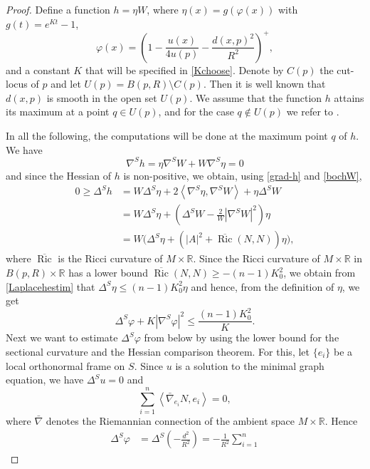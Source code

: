 \documentclass[10pt,a4paper,reqno]{amsart}
\newcommand{\R}{\mathbb{R}}
\newcommand{\ang}[1]{\left\langle #1 \right\rangle}
\DeclareMathOperator\Ric{Ric}
\numberwithin{equation}{section}
\theoremstyle{plain}
\theoremstyle{definition}
\begin{document}
    \begin{proof}
    Define a function $h = \eta W$, where $\eta(x) = g(\varphi(x))$ with $g(t) = e^{Kt}-1$,  
    	\[
		\varphi(x) = \left( 1- \frac{u(x)}{4u(p)} - \frac{d(x,p)^2}{R^2} \right)^+,
	\]
	and a constant $K$ that will be specified in \eqref{Kchoose}.
    Denote by $C(p)$ the cut-locus of $p$ and let $U(p) = B(p,R) \setminus C(p)$. Then it is well known
    that $d(x,p)$ is smooth in the open set $U(p)$. We assume that the function $h$ attains its maximum 
    at a point $q\in U(p)$, and for the case
    $q\not\in U(p)$ we refer to \cite{RSS}.
    
    In all the following, the computations will be done at the maximum point $q$ of $h$. We have
	\begin{equation}\label{grad-h}
	  \nabla^S h = \eta \nabla^S W + W\nabla^S \eta = 0
	\end{equation}
    and since the Hessian of $h$ is non-positive, we obtain, using \eqref{grad-h} and \eqref{bochW},
      \begin{align}\label{Laplacehestim}
       0\ge \Delta^S h &= W \Delta^S \eta + 2\ang{\nabla^S\eta,\nabla^S W} + \eta \Delta^S W \nonumber \\
	&= W \Delta^S \eta + \left( \Delta^S W - \frac{2}{W} |\nabla^S W|^2 \right) \eta  \\
	&= W \big( \Delta^S \eta + (|A|^2 + \overline{\Ric}(N,N))\eta \big),\nonumber
      \end{align}
    where $\overline{\Ric}$ is the Ricci curvature of $M\times\R$. Since the Ricci curvature of $M\times\R $ in 
$B (p,R)\times\R $ has a lower bound $\overline {\Ric}(N,N)\ge -(n-1)K_0^2$, we obtain from \eqref{Laplacehestim} that 
    $\Delta^S \eta \le (n-1)K_0^2\eta$ 
    and hence, from the definition of $\eta$, we get
	\begin{equation}\label{laplacephi}
	 \Delta^S \varphi + K|\nabla^S \varphi|^2 \le \frac{(n-1)K_0^2}{K}.
	\end{equation}
Next we want to estimate $\Delta^S \varphi$ from below by using the lower bound for the sectional curvature
and the Hessian comparison theorem. For this, let $\{e_i\}$ be a local orthonormal
frame on $S$. Since $u$ is a solution to the minimal graph equation, we have $\Delta^S u =0$ and
\[
\sum_{i=1}^n \ang{\bar\nabla_{e_i}N,e_i} =0,
\]
where $\bar{\nabla}$ denotes the Riemannian connection of the ambient space $M\times\R$.
Hence
\begin{align*}
	\Delta^S \varphi &= \Delta^S\left( -\frac{d^2}{R^2} \right) =- \frac{1}{R^2} \sum_{i=1}^n 

\end{align*}
\end{proof}
\end{document}
